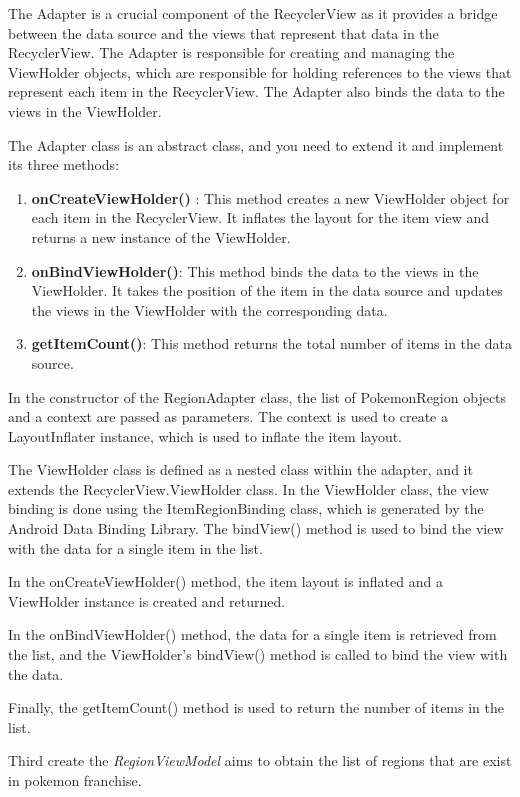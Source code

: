 \documentclass[a4paper, 12pt]{article}
\begin{document}
The Adapter is a crucial component of the RecyclerView as it provides a bridge between the data source and the views that represent that data in the RecyclerView. The Adapter is responsible for creating and managing the ViewHolder objects, which are responsible for holding references to the views that represent each item in the RecyclerView. The Adapter also binds the data to the views in the ViewHolder.

The Adapter class is an abstract class, and you need to extend it and implement its three methods:

\begin{enumerate}
    \item \textbf{onCreateViewHolder()} : This method creates a new ViewHolder object for each item in the RecyclerView. It inflates the layout for the item view and returns a new instance of the ViewHolder.
    \item \textbf{onBindViewHolder()}: This method binds the data to the views in the ViewHolder. It takes the position of the item in the data source and updates the views in the ViewHolder with the corresponding data.
    \item \textbf{getItemCount()}: This method returns the total number of items in the data source.

\end{enumerate}

In the constructor of the RegionAdapter class, the list of PokemonRegion objects and a context are passed as parameters. The context is used to create a LayoutInflater instance, which is used to inflate the item layout.

The ViewHolder class is defined as a nested class within the adapter, and it extends the RecyclerView.ViewHolder class. In the ViewHolder class, the view binding is done using the ItemRegionBinding class, which is generated by the Android Data Binding Library. The bindView() method is used to bind the view with the data for a single item in the list.

In the onCreateViewHolder() method, the item layout is inflated and a ViewHolder instance is created and returned.

In the onBindViewHolder() method, the data for a single item is retrieved from the list, and the ViewHolder's bindView() method is called to bind the view with the data.

Finally, the getItemCount() method is used to return the number of items in the list.

Third create the \textit{RegionViewModel} aims to obtain the list of regions that are exist in pokemon franchise.
\end{document}
